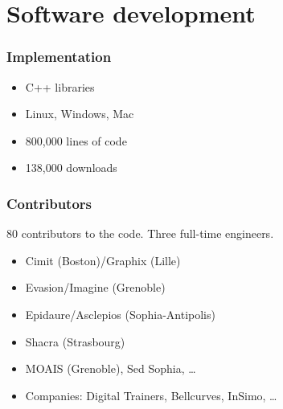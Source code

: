\documentclass[a4paper,compress]{beamer}
\begin{document}
% 
% 



\section{Software development}

\begin{frame}
 \frametitle{Implementation}
\begin{itemize}
 \item C++ libraries 
 \item Linux, Windows, Mac
 \item 800,000 lines of code
 \item 138,000 downloads
\end{itemize}

\end{frame}



\begin{frame}
 \frametitle{Contributors}
 80 contributors to the code. Three full-time engineers.
\begin{itemize}
 \item Cimit (Boston)/Graphix (Lille)
 \item Evasion/Imagine (Grenoble)
 \item Epidaure/Asclepios (Sophia-Antipolis)
 \item Shacra (Strasbourg)
 \item MOAIS (Grenoble), Sed Sophia, …
 \item Companies: Digital Trainers, Bellcurves, InSimo, …
\end{itemize}

\end{frame}
\end{document}
